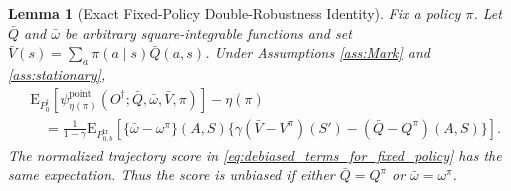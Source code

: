 \documentclass[12pt]{article}
\newtheorem{lemma}[theorem]{Lemma}
\theoremstyle{remark}\newtheorem{remark}[theorem]{Remark}\theoremstyle{plain}
\newcommand{\E}{\mathrm{E}}
\newcommand{\EstFunPoi}{{\psi}^{\text{point}}}
\begin{document}
\begin{lemma}[Exact Fixed-Policy Double-Robustness Identity]
\label{lem:exact_dr_identity}
    Fix a policy $\pi$.  Let $\bar Q$ and $\bar\omega$ be arbitrary
    square-integrable functions and set
    $\bar V(s)=\sum_a\pi(a\mid s)\bar Q(a,s)$.  Under Assumptions
    \ref{ass:Mark} and \ref{ass:stationary},
    \[
        \begin{aligned}
        &\E_{P_0^\dagger}\!
        \left[\EstFunPoi_{\eta(\pi)}
        (O^\dagger;\bar Q,\bar\omega,\bar V,\pi)\right]-\eta(\pi)\\
        &\quad =
        \frac{1}{1-\gamma}
        \E_{P_{0,b}^{\mathrm{tr}}}\!\left[
        \{\bar\omega-\omega^\pi\}(A,S)
        \{\gamma(\bar V-V^\pi)(S')
        -(\bar Q-Q^\pi)(A,S)\}\right].
        \end{aligned}
    \]
    The normalized trajectory score in
    \eqref{eq:debiased_terms_for_fixed_policy} has the same
    expectation.  Thus the score is unbiased if either
    $\bar Q=Q^\pi$ or $\bar\omega=\omega^\pi$.
\end{lemma}
\end{document}
